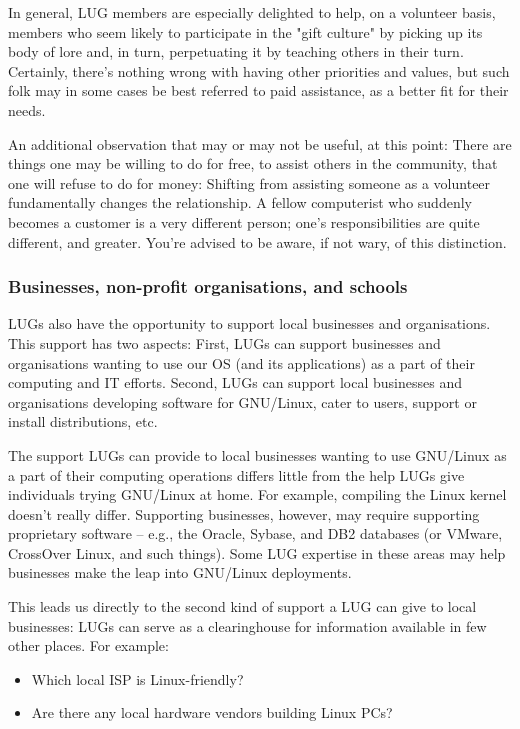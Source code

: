 \documentclass{HOWTO}
\begin{document}
In general, LUG members are especially delighted to help, on a volunteer
basis, members who seem likely to participate in the "gift
culture" by picking up its body of lore and, in turn, perpetuating it
by teaching others in their turn.  Certainly, there's nothing wrong with
having other priorities and values, but such folk may in some cases be
best referred to paid assistance, as a better fit for their needs.

An additional observation that may or may not be useful, at this point:
There are things one may be willing to do for free, to assist others in the
community, that one will refuse to do for money:  Shifting from
assisting someone as a volunteer fundamentally changes the relationship.
A fellow computerist who suddenly becomes a customer is a very different
person; one's responsibilities are quite different, and greater.  You're
advised to be aware, if not wary, of this distinction.






\subsubsection{Businesses, non-profit organisations, and schools}

LUGs also have the opportunity to support local businesses and
organisations. This support has two aspects: First, LUGs can support
businesses and organisations wanting to use our OS (and its 
applications) as a part of their
computing and IT efforts. Second, LUGs can support local businesses
and organisations developing software for GNU/Linux, cater to users,
support or install distributions, etc.

The support LUGs can provide to local businesses wanting to use GNU/Linux as
a part of their computing operations differs little from the help LUGs
give individuals trying GNU/Linux at home. For example, compiling the Linux
kernel doesn't really differ. Supporting businesses, however, may
require supporting proprietary software -- e.g., the Oracle, Sybase,
and DB2 databases (or VMware, CrossOver Linux, and such things).   
Some LUG expertise in these areas may help businesses make the leap
into GNU/Linux deployments.

This leads us directly to the second kind of support a LUG can give to
local businesses: LUGs can serve as a clearinghouse for information
available in few other places. For example:

\begin{itemize}
\item Which local ISP is Linux-friendly?
\item Are there any local hardware vendors building Linux PCs?
\end{itemize}
\end{document}
